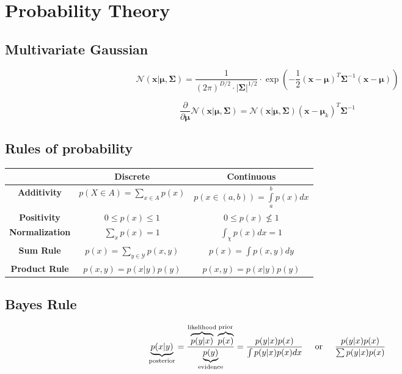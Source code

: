 \section{Probability Theory}
\subsection{Multivariate Gaussian}
$$\mathcal{N}\left(\bm{x}|\bm{\mu}, \bm{\Sigma}\right) = \frac{1}{\left(2\pi\right)^{D/2} \cdot |\bm{\Sigma}|^{1/2}}\cdot \exp\left(-\frac{1}{2}\left(\bm{x}-\bm{\mu}\right)^T\bm{\Sigma}^{-1}\left(\bm{x}-\bm{\mu}\right)\right)$$

$$\frac{\partial}{\partial \bm{\mu}}\mathcal{N}\left(\bm{x}|\bm{\mu}, \bm{\Sigma}\right)  = \mathcal{N}\left(\bm{x}|\bm{\mu}, \bm{\Sigma}\right) \left(\bm{x}-\bm{\mu}_k\right)^T\bm{\Sigma}^{-1}$$


\subsection{Rules of probability}
\begin{table}[ht]
	\centering
	\begin{tabular}{c|cc}
		& \textbf{Discrete} & \textbf{Continuous}\\
		\hline
		\textbf{Additivity} & $p(X\in A) = \sum\limits_{x\in A}p(x)$ & $p\left(x\in (a,b)\right) = \int\limits_{a}^{b}p(x)dx$\\[10pt]
		\textbf{Positivity} & $0 \leq p(x)\leq 1$ & $0 \leq p(x) \not\leq 1$\\[10pt]
		\textbf{Normalization} & $\sum_{x} p(x) = 1$ & $\int_{\chi} p(x)dx = 1$\\[10pt]
		\textbf{Sum Rule} & $p(x) = \sum\limits_{y\in\mathcal{Y}} p(x,y)$ & $p(x)=\int\limits p(x,y)dy$\\[10pt]
		\textbf{Product Rule} & $p(x,y) = p(x|y)p(y)$ & $p(x,y) = p(x|y)p(y)$
	\end{tabular}
\end{table}
\subsection{Bayes Rule}
$$\underbrace{p(x|y)}_{\text{posterior}} = \frac{\overbrace{p(y|x)}^{\text{likelihood}} \overbrace{p(x)}^{\text{prior}}}{\underbrace{p(y)}_{\text{evidence}}} = \frac{p(y|x) p(x)}{\int p(y|x) p(x)dx} \text{\hspace{5mm}or\hspace{5mm}} \frac{p(y|x) p(x)}{\sum p(y|x) p(x)}$$